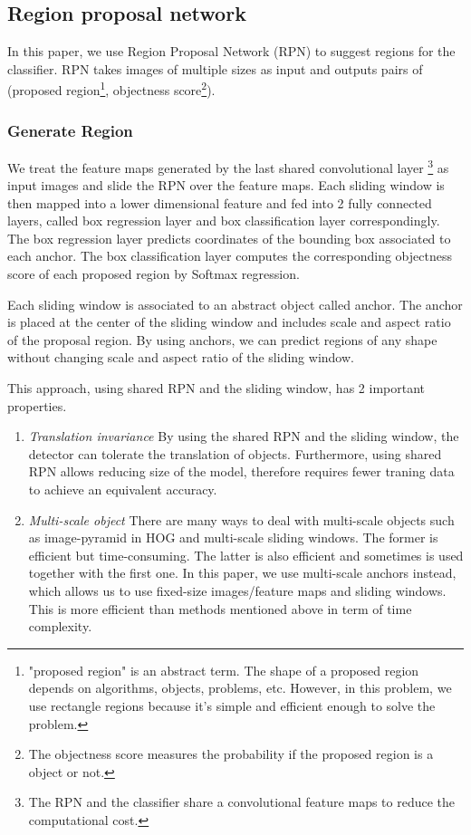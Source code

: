 \documentclass[conference]{IEEEtran}
\begin{document}
\subsection{Region proposal network}\label{RPN}
In this paper, we use Region Proposal Network (RPN)\cite{slidingwin5} to suggest regions for the classifier. RPN takes images of multiple sizes as input and outputs pairs of 
(proposed   region\footnote{"proposed region" is an abstract term. The shape of a proposed region depends on algorithms, objects, problems, etc. However, in this problem, we use rectangle regions because it's simple and efficient enough to solve the problem.}, objectness score\footnote{The objectness score measures the probability if the proposed region is a object or not.}).
\subsubsection{Generate Region}
We treat the feature maps generated by the last shared convolutional layer \footnote{The RPN and the classifier share a convolutional feature maps to reduce the computational cost.} as input images and slide the RPN over the feature maps. Each sliding window is then mapped into a lower dimensional feature and fed into 2 fully connected layers, called box regression layer and box classification layer correspondingly. The box regression layer predicts coordinates of the bounding box associated to each anchor. The box classification layer computes the corresponding objectness score of each proposed region by Softmax regression.

Each sliding window is associated to an abstract object called anchor. The anchor is placed at the center of the sliding window and includes scale and aspect ratio of the proposal region. By using anchors, we can predict regions of any shape without changing scale and aspect ratio of the sliding window. 

This approach, using shared RPN and the sliding window, has 2 important properties.

\begin{enumerate}
	\item \emph{Translation invariance} By using the shared RPN and the sliding window, the detector can tolerate the translation of objects. Furthermore, using shared RPN allows reducing size of the model, therefore requires fewer traning data to achieve an equivalent accuracy.  
	\item \emph{Multi-scale object} There are many ways to deal with multi-scale objects such as image-pyramid in HOG and multi-scale sliding windows. The former is efficient but time-consuming. The latter is also efficient and sometimes is used together with the first one. In this paper, we use multi-scale anchors instead, which allows us to use fixed-size images/feature maps and sliding windows. This is more efficient than methods mentioned above in term of time complexity.
\end{enumerate}
\end{document}
